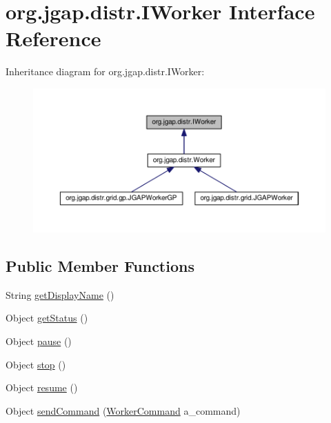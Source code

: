 \hypertarget{interfaceorg_1_1jgap_1_1distr_1_1_i_worker}{\section{org.\-jgap.\-distr.\-I\-Worker Interface Reference}
\label{interfaceorg_1_1jgap_1_1distr_1_1_i_worker}
}


Inheritance diagram for org.\-jgap.\-distr.\-I\-Worker\-:
\nopagebreak
\begin{figure}[H]
\begin{center}
\leavevmode
\includegraphics[width=350pt]{interfaceorg_1_1jgap_1_1distr_1_1_i_worker__inherit__graph}
\end{center}
\end{figure}
\subsection*{Public Member Functions}
\begin{DoxyCompactItemize}
\item 
String \hyperlink{interfaceorg_1_1jgap_1_1distr_1_1_i_worker_ae1ed7812a9285de55f5091f5be7a8da2}{get\-Display\-Name} ()
\item 
Object \hyperlink{interfaceorg_1_1jgap_1_1distr_1_1_i_worker_aaf06b7ac385ade8ddab09a0428ac5f9a}{get\-Status} ()
\item 
Object \hyperlink{interfaceorg_1_1jgap_1_1distr_1_1_i_worker_acb611f7ef823cb7a128330965d008f31}{pause} ()
\item 
Object \hyperlink{interfaceorg_1_1jgap_1_1distr_1_1_i_worker_a6d1dcb48750d1fb0acd7ab9e3033a3e5}{stop} ()
\item 
Object \hyperlink{interfaceorg_1_1jgap_1_1distr_1_1_i_worker_ab279e28dc98ac6769f68f31ed437b876}{resume} ()
\item 
Object \hyperlink{interfaceorg_1_1jgap_1_1distr_1_1_i_worker_ac852bfd339a9f0c85903b1e335c3926d}{send\-Command} (\hyperlink{classorg_1_1jgap_1_1distr_1_1_worker_command}{Worker\-Command} a\-\_\-command)
\end{DoxyCompactItemize}
